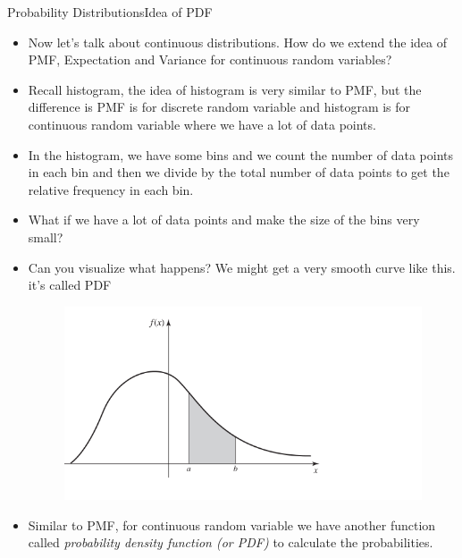 \documentclass[8pt, usepdftitle = false]{beamer}
\begin{document}
\begin{frame}[allowframebreaks]{Probability Distributions}{Idea of PDF}

\begin{itemize}


\item Now let's talk about continuous distributions. How do we extend the idea of PMF, Expectation and Variance for continuous random variables?


\item Recall histogram, the idea of histogram is very similar to PMF, but the difference is PMF is for discrete random variable and histogram is for continuous random variable where we have a lot of data points.


\item In the histogram, we have some bins and we count the number of data points in each bin and then we divide by the total number of data points to get the relative frequency in each bin.


\item What if we have a lot of data points and make the size of the bins very small? 

\item Can you visualize what happens? We might get a very smooth curve like this. it's called PDF


\begin{figure}
\centering
\includegraphics[scale = .3]{Images/PDF_1.png}
\end{figure}

\framebreak

\item Similar to PMF, for continuous random variable we have another function called \emph{probability density function (or PDF)} to calculate the probabilities.




\end{itemize}
\end{frame}
\end{document}
